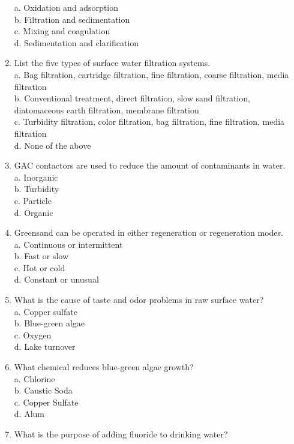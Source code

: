 \begin{enumerate}
a. Oxidation and adsorption\\
b. Filtration and sedimentation\\
c. Mixing and coagulation\\
d. Sedimentation and clarification\\
\item List the five types of surface water filtration systems.\\
a. Bag filtration, cartridge filtration, fine filtration, coarse filtration, media filtration\\
b. Conventional treatment, direct filtration, slow sand filtration, diatomaceous earth filtration, membrane filtration\\
c. Turbidity filtration, color filtration, bag filtration, fine filtration, media filtration\\
d. None of the above\\
\item GAC contactors are used to reduce the amount of contaminants in water.\\
a. Inorganic\\
b. Turbidity\\
c. Particle\\
d. Organic\\
\item Greensand can be operated in either regeneration or regeneration modes.\\
a. Continuous or intermittent\\
b. Fast or slow\\
c. Hot or cold\\
d. Constant or unusual\\
\item What is the cause of taste and odor problems in raw surface water?\\
a. Copper sulfate\\
b. Blue-green algae\\
c. Oxygen\\
d. Lake turnover\\
\item What chemical reduces blue-green algae growth?\\
a. Chlorine\\
b. Caustic Soda\\
c. Copper Sulfate\\
d. Alum\\
\item What is the purpose of adding fluoride to drinking water?\\

\end{enumerate}
